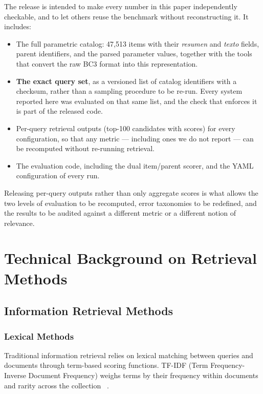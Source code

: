 \documentclass[preprint,12pt]{elsarticle}
\begin{document}
The release is intended to make every number in this paper independently checkable, and to let others reuse the benchmark without reconstructing it. It includes:

\begin{itemize}
  \item The full parametric catalog: 47,513 items with their \textit{resumen} and \textit{texto} fields, parent identifiers, and the parsed parameter values, together with the tools that convert the raw BC3 format into this representation.
  \item \textbf{The exact query set}, as a versioned list of catalog identifiers with a checksum, rather than a sampling procedure to be re-run. Every system reported here was evaluated on that same list, and the check that enforces it is part of the released code.
  \item Per-query retrieval outputs (top-100 candidates with scores) for every configuration, so that any metric --- including ones we do not report --- can be recomputed without re-running retrieval.
  \item The evaluation code, including the dual item/parent scorer, and the YAML configuration of every run.
\end{itemize}

Releasing per-query outputs rather than only aggregate scores is what allows the two levels of evaluation to be recomputed, error taxonomies to be redefined, and the results to be audited against a different metric or a different notion of relevance.

\section{Technical Background on Retrieval Methods}
\label{app:technical-background}

\subsection{Information Retrieval Methods}

\subsubsection{Lexical Methods}

Traditional information retrieval relies on lexical matching between queries and documents through term-based scoring functions. TF-IDF (Term Frequency-Inverse Document Frequency) weighs terms by their frequency within documents and rarity across the collection ~\cite{salton1988term, manning2008introduction}.
\end{document}
